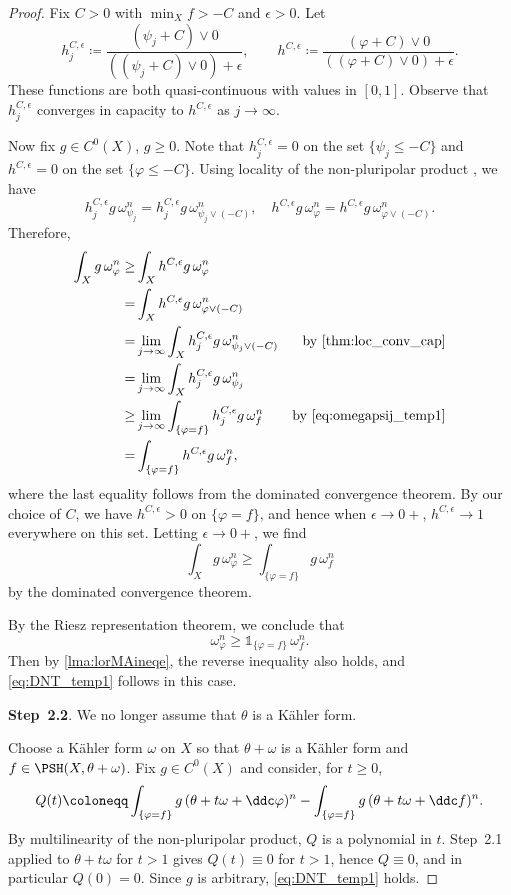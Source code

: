 \begin{proof}
Fix $C>0$ with $\min_X f>-C$ and $\epsilon>0$.
Let
\[
h_j^{C,\epsilon}\coloneqq \frac{(\psi_j+C)\lor 0}{\left((\psi_j+C)\lor 0 \right)+\epsilon},\qquad h^{C,\epsilon}\coloneqq \frac{(\varphi+C)\lor 0}{\left((\varphi+C)\lor 0\right)+\epsilon}.
\]
These functions are both quasi-continuous with values in $[0,1]$.
Observe that $h_j^{C,\epsilon}$ converges in capacity to $h^{C,\epsilon}$ as $j\to\infty$.


Now fix $g\in C^0(X)$, $g\geq 0$. Note that $h_j^{C,\epsilon}=0$ on the set $\{\psi_j\leq -C\}$ and $h^{C,\epsilon}=0$ on the set $\{\varphi\leq -C\}$.
Using locality of the non-pluripolar product , we have
\[
h_j^{C,\epsilon}g \,\omega_{\psi_j}^n=h_j^{C,\epsilon}g \,\omega_{\psi_j\lor (-C)}^n,\quad h^{C,\epsilon}g \,\omega_{\varphi}^n=h^{C,\epsilon}g \,\omega_{\varphi\lor (-C)}^n.
\]
Therefore,
\[
\begin{aligned}
\int_X g\,\omega_{\varphi}^n\geq & \int_X h^{C,\epsilon}g \,\omega_{\varphi}^n & \\
=& \int_X h^{C,\epsilon}g \,\omega_{\varphi\lor (-C)}^n &\\
=& \lim_{j\to\infty} \int_X h_j^{C,\epsilon}g \,\omega_{\psi_j\lor (-C)}^n & \textup{by \cref{thm:loc_conv_cap}}\\
=&\lim_{j\to\infty} \int_X h_j^{C,\epsilon}g \,\omega_{\psi_j}^n &\\
\geq & \lim_{j\to\infty} \int_{\{\varphi=f\}} h_j^{C,\epsilon}g \,\omega_{f}^n & \textup{by }\eqref{eq:omegapsij_temp1}\\
=& \int_{\{\varphi=f\}}h^{C,\epsilon}g \,\omega_{f}^n,
\end{aligned}
\]
where the last equality follows from the dominated convergence theorem.
By our choice of $C$, we have $h^{C,\epsilon}>0$ on $\{\varphi=f\}$, and hence when $\epsilon\to 0+$, $h^{C,\epsilon}\to 1$ everywhere on this set. Letting $\epsilon\to 0+$, we find
\[
\int_X g\,\omega_{\varphi}^n\geq \int_{\{\varphi=f\}}g \,\omega_{f}^n
\]
by the dominated convergence theorem.

By the Riesz representation theorem, we conclude that
\[
\omega_{\varphi}^n\geq \mathds{1}_{\{\varphi=f\}}\,\omega_{f}^n.
\]
Then by \cref{lma:lorMAineqe}, the reverse inequality also holds, and \eqref{eq:DNT_temp1} follows in this case.

\textbf{Step~2.2}. We no longer assume that $\theta$ is a Kähler form.

Choose a Kähler form $\omega$ on $X$ so that $\theta+\omega$ is a Kähler form and $f\in \PSH(X,\theta+\omega)$.
Fix $g\in C^0(X)$ and consider, for $t\geq 0$,
\[
Q(t)\coloneqq \int_{\{\varphi=f\}}g\,(\theta+t\omega+\ddc\varphi)^n - \int_{\{\varphi=f\}}g\,(\theta+t\omega+\ddc f)^n.
\]
By multilinearity of the non-pluripolar product, $Q$ is a polynomial in $t$. Step~2.1 applied to $\theta+t\omega$ for $t>1$ gives $Q(t)\equiv 0$ for $t>1$, hence $Q\equiv 0$, and in particular $Q(0)=0$. Since $g$ is arbitrary, \eqref{eq:DNT_temp1} holds.


\end{proof}
